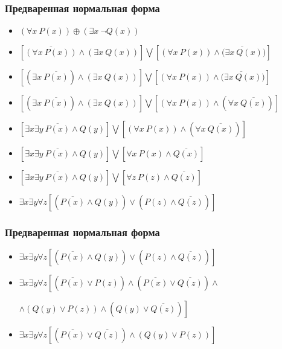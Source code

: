 \documentclass[24pt,pdf,hyperref={unicode}]{beamer}
\begin{document}
\begin{frame}\frametitle{Предваренная нормальная форма}

\begin{itemize}
\item<+-> $(\forall x\ P(x))\oplus (\exists x\ \neg Q(x))$
\item<+-> $\left[\overline{(\forall x\ P(x))}\wedge(\exists x\ Q(x))\right] \bigvee \left[(\forall x\ P(x))\wedge\overline{(\exists x\ Q(x)})\right]$
\item<+-> $\left[(\exists x\ \overline{P(x)})\wedge(\exists x\ Q(x))\right] \bigvee \left[(\forall x\ P(x))\wedge\overline{(\exists x\ Q(x)})\right]$
\item<+-> $\left[(\exists x\ \overline{P(x)})\wedge(\exists x\ Q(x))\right] \bigvee \left[(\forall x\ P(x))\wedge(\forall x\ \overline{Q(x)})\right]$
\item<+-> $\left[\exists x \exists y\ \overline{P(x)}\wedge Q(y)\right] \bigvee \left[(\forall x\ P(x))\wedge(\forall x\ \overline{Q(x)})\right]$
\item<+-> $\left[\exists x \exists y\ \overline{P(x)}\wedge Q(y)\right] \bigvee \left[\forall x\ P(x)\wedge\overline{Q(x)}\right]$
\item<+-> $\left[\exists x \exists y\ \overline{P(x)}\wedge Q(y)\right] \bigvee \left[\forall z\ P(z)\wedge\overline{Q(z)}\right]$
\item<+-> $\exists x \exists y \forall z \left[ (\overline{P(x)}\wedge Q(y)) \vee (P(z)\wedge\overline{Q(z)})\right]$
\end{itemize}
\end{frame}
\begin{frame}\frametitle{Предваренная нормальная форма}
\begin{itemize}
\item<+-> $\exists x \exists y \forall z \left[ (\overline{P(x)}\wedge Q(y)) \vee (P(z)\wedge\overline{Q(z)})\right]$

\item<+-> $\exists x \exists y \forall z \left[ (\overline{P(x)}\vee P(z))\wedge (\overline{P(x)}\vee \overline{Q(z)}) \wedge \right.$

\hspace{3cm} $ \left. \wedge (Q(y) \vee P(z)) \wedge (Q(y) \vee \overline{Q(z)}) \right] $

\item<+-> $\exists x \exists y \forall z \left[ (\overline{P(x)}\vee \overline{Q(z)}) \wedge (Q(y) \vee P(z))  \right]$

\end{itemize}
\end{frame}
\end{document}
